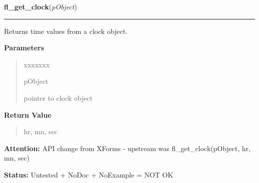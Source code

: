     \label{xformslib:library:fl_get_clock}

    \vspace{0.5ex}

\hspace{.8\funcindent}\begin{boxedminipage}{\funcwidth}

    \raggedright \textbf{fl\_get\_clock}(\textit{pObject})

    \vspace{-1.5ex}

    \rule{\textwidth}{0.5\fboxrule}
\setlength{\parskip}{2ex}
    Returns time values from a clock object.

\setlength{\parskip}{1ex}
      \textbf{Parameters}
      \vspace{-1ex}

      \begin{quote}
        \begin{Ventry}{xxxxxxx}

          \item[pObject]

          pointer to clock object

        \end{Ventry}

      \end{quote}

      \textbf{Return Value}
    \vspace{-1ex}

      \begin{quote}
      hr, mn, sec

      \end{quote}

\textbf{Attention:} API change from XForms - upstream was fl\_get\_clock(pObject, hr, mn, sec)



\textbf{Status:} Untested + NoDoc + NoExample = NOT OK



    \end{boxedminipage}

    \label{xformslib:library:fl_set_clock_adjustment}

    \vspace{0.5ex}

